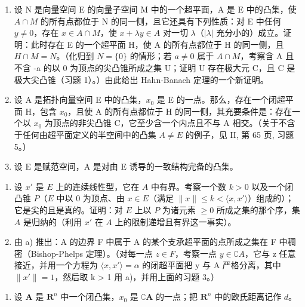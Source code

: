 \begin{enumerate}
\def\labelenumi{\arabic{enumi})}
\setcounter{enumi}{1}
\item
  设 N 是向量空间 E 的向量子空间 M 中的一个超平面，A 是 E 中的凸集，使 \(A \cap M\) 的所有点都位于 N 的同一侧，且它还具有下列性质：对 E 中任何 \(y \neq 0\)，存在 \(x \in A \cap M\)，使 \(x + \lambda y \in A\) 对一切 \(\lambda\)（\(|\lambda|\) 充分小的）成立。证明：此时存在 E 的一个超平面 H，使 A 的所有点都位于 H 的同一侧，且 \(H \cap M = N\)。（化归到 \(N = \{0\}\) 的情形；若 \(a \neq 0\) 属于 \(A \cap M\)，考察含 A 且不含 -a 的以 0 为顶点的尖凸锥所成之集 U；证明 U 存在极大元 C，且 C 是极大尖凸锥（习题 1）。）由此给出 Hahn-Banach 定理的一个新证明。
\item
  设 A 是拓扑向量空间 E 中的凸集，\(x_{0}\) 是 E 的一点。那么，存在一个闭超平面 H，包含 \(x_{0}\)，且使 A 的所有点都位于 H 的同一侧，其充要条件是：存在一个以 \(x_{0}\) 为顶点的非尖凸锥 C，它至少含一个内点且不与 A 相交。（关于不含于任何由超平面定义的半空间中的凸集 \(A \neq E\) 的例子，见 II, 第 65 页, 习题 5。）
\item
  设 E 是赋范空间，A 是对由 E 诱导的一致结构完备的凸集。
\end{enumerate}

\begin{enumerate}
\def\labelenumi{\alph{enumi})}
\item
  设 \(x'\) 是 \(E\) 上的连续线性型，它在 \(A\) 中有界。考察一个数 \(k > 0\) 以及一个闭凸锥 \(P\)（\(E\) 中以 0 为顶点、由 \(x \in E\)（满足 \(\| x \| \leqslant k < \langle x, x' \rangle\)）组成的）；它是尖的且是真的。证明：对 \(E\) 上以 \(P\) 为诸元素 \(\geqslant 0\) 所成之集的那个序，集 \(A\) 是归纳的（利用 \(x'\) 在 \(A\) 上的限制递增且有界这一事实）。
\item
  由 a) 推出：A 的边界 F 中属于 A 的某个支承超平面的点所成之集在 F 中稠密（Bishop-Phelps 定理）。（对每一点 \(z \in F\)，考察一点 \(y \in \complement A\)，它与 z 任意接近，并用一个方程为 \(\langle x, x' \rangle = \alpha\) 的闭超平面把 y 与 A 严格分离，其中 \(\|x' \| = 1\)，然后取 k > 1 用 a)，并用上面的习题 3。）
\end{enumerate}

\begin{enumerate}
\def\labelenumi{\arabic{enumi})}
\setcounter{enumi}{4}
\tightlist
\item
  设 \(\mathbf{A}\) 是 \(\mathbf{R}^n\) 中一个闭凸集，\(x_0\) 是 \(\complement \mathbf{A}\) 的一点；把 \(\mathbf{R}^n\) 中的欧氏距离记作 \(d\)。
\end{enumerate}

